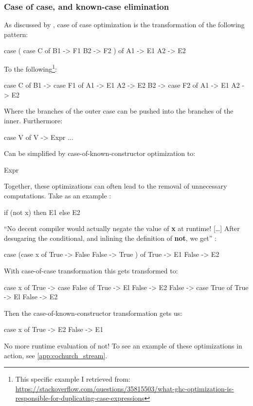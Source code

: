 \subsubsection{Case of case, and known-case elimination}
As discussed by \cite{Jones1996}, case of case optimization is the transformation of the following pattern:
\begin{spec}
case ( 
  case C of 
    B1 -> F1
    B2 -> F2
  ) of
  A1 -> E1
  A2 -> E2
\end{spec}
To the following\footnote{This specific example I retrieved from: \url{https://stackoverflow.com/questions/35815503/what-ghc-optimization-is-responsible-for-duplicating-case-expressions}}:
\begin{spec}
case C of    
  B1 -> case F1 of
    A1 -> E1
    A2 -> E2
  B2 -> case F2 of
    A1 -> E1
    A2 -> E2
\end{spec}
Where the branches of the outer case can be pushed into the branches of the inner.
Furthermore:
\begin{spec}
case V of
  V -> Expr
  ...
\end{spec}
Can be simplified by case-of-known-constructor optimization to:
\begin{spec}
Expr
\end{spec}
Together, these optimizations can often lead to the removal of unnecessary computations. Take as an example \citep{Jones1996}:
\begin{spec}
if (not x) then E1 else E2
\end{spec}
``No decent compiler would actually negate the value of \textbf{x} at runtime! [\ldots] After desugaring the conditional, and inlining the definition of \textbf{not}, we get'' \citep{Jones1996}:
\begin{spec}
case (case x of
  True -> False
  False -> True
) of 
  True -> E1 
  False -> E2
\end{spec}
With case-of-case transformation this gets transformed to:
\begin{spec}
case x of 
  True -> case False of
    True -> El
    False -> E2
  False -> case True of
    True -> El
    False -> E2
\end{spec}
Then the case-of-known-constructor transformation gets us:
\begin{spec}
case x of
  True -> E2
  False -> E1
\end{spec}
No more runtime evaluation of not!
To see an example of these optimizations in action, see \autoref{app:cochurch_stream}.


